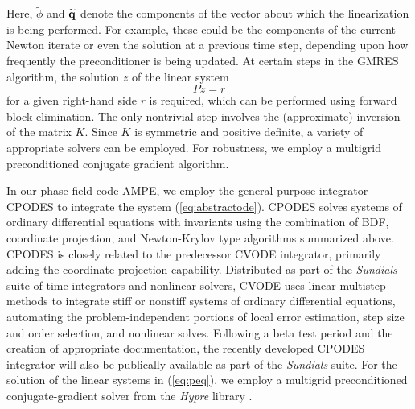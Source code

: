 %
Here, $\widetilde{\phi}$ and $\widetilde{\bf q}$ denote the components
of the vector about which the linearization is being performed.  For
example, these could be the components of the current Newton iterate
or even the solution at a previous time step, depending upon how
frequently the preconditioner is being updated.  At certain steps in
the GMRES algorithm, the solution $z$ of the linear system
%
\begin{equation}
  Pz = r
\label{eq:peq}
\end{equation}
%
for a given right-hand side $r$ is required, which can be performed
using forward block elimination.  The only nontrivial step involves
the (approximate) inversion of the matrix $K$.  Since $K$ is symmetric
and positive definite, a variety of appropriate solvers can be
employed.  For robustness, we employ a multigrid preconditioned
conjugate gradient algorithm.

In our phase-field code AMPE, we employ the general-purpose integrator
CPODES to integrate the system (\ref{eq:abstractode}).  CPODES solves
systems of ordinary differential equations with invariants using the
combination of BDF, coordinate projection, and Newton-Krylov type
algorithms summarized above.  CPODES is closely related to the
predecessor CVODE integrator, primarily adding the coordinate-projection capability.  Distributed as part of the {\em Sundials}
\cite{Sundials} suite of time integrators and nonlinear solvers, CVODE
uses linear multistep methods to integrate stiff or nonstiff systems
of ordinary differential equations, automating the problem-independent
portions of local error estimation, step size and order selection, and
nonlinear solves.  Following a beta test period and the creation of
appropriate documentation, the recently developed CPODES integrator
will also be publically available as part of the {\em Sundials} suite.
For the solution of the linear systems in (\ref{eq:peq}), we employ a
multigrid preconditioned conjugate-gradient solver from the {\em
Hypre} library \cite{Hypre}.

